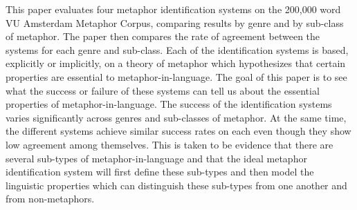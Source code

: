 This paper evaluates four metaphor identification systems on the 200,000 word VU Amsterdam Metaphor Corpus, comparing results by genre and by sub-class of
 metaphor. The paper then compares the rate of agreement between the systems for
 each genre and sub-class. Each of the identification systems is based,
 explicitly or implicitly, on a theory of metaphor which hypothesizes that
 certain properties are essential to metaphor-in-language. The goal of this
 paper is to see what the success or failure of these systems can tell us about
 the essential properties of metaphor-in-language. The success of the
 identification systems varies significantly across genres and sub-classes of
 metaphor. At the same time, the different systems achieve similar success rates
 on each even though they show low agreement among themselves. This is taken to
 be evidence that there are several sub-types of metaphor-in-language and that
 the ideal metaphor identification system will first define these sub-types and
 then model the linguistic properties which can distinguish these sub-types from
 one another and from non-metaphors.

